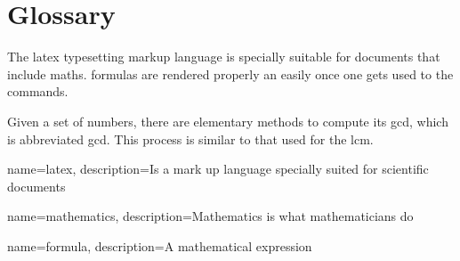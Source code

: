 \section{Glossary}

The \Gls{latex} typesetting markup language is specially suitable 
for documents that include \gls{maths}. \Glspl{formula} are 
rendered properly an easily once one gets used to the commands.
 
Given a set of numbers, there are elementary methods to compute 
its \acrlong{gcd}, which is abbreviated \acrshort{gcd}. This 
process is similar to that used for the \acrfull{lcm}.



{
        name=latex,
        description={Is a mark up language specially suited for 
scientific documents}
}
 
{
        name=mathematics,
        description={Mathematics is what mathematicians do}
}
 
{
        name=formula,
        description={A mathematical expression}
}
 
 
 
 

 \clearpage
 
\printglossary[type=\acronymtype]
 
\printglossary